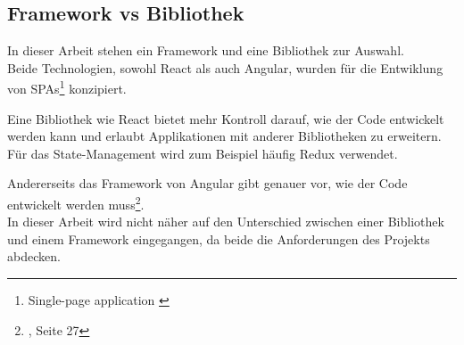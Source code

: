 \subsection{Framework vs Bibliothek}
\begin{flushleft}
  In dieser Arbeit stehen ein Framework und eine Bibliothek zur Auswahl.
  \\
  Beide Technologien, sowohl React als auch Angular, wurden für die Entwiklung von SPAs\footnote{Single-page application {\cite{MO1}}} konzipiert.

  Eine Bibliothek wie React bietet mehr Kontroll darauf, wie der Code entwickelt werden kann und erlaubt Applikationen mit anderer Bibliotheken zu erweitern. Für das State-Management wird zum Beispiel häufig Redux{\cite{RE1}} verwendet.

  Andererseits das Framework von Angular gibt genauer vor, wie der Code entwickelt werden muss\footnote{{\cite{AN1}}, Seite 27}.
  \\
  In dieser Arbeit wird nicht näher auf den Unterschied zwischen einer Bibliothek und einem Framework eingegangen, da beide die Anforderungen des Projekts abdecken.
\end{flushleft}